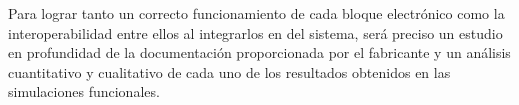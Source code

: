\vspace{3mm}

Para lograr tanto un correcto funcionamiento de cada bloque electrónico como la interoperabilidad entre ellos al integrarlos en del sistema, será preciso un estudio en profundidad de la documentación proporcionada por el fabricante y un análisis cuantitativo y cualitativo de cada uno de los resultados obtenidos en las simulaciones funcionales. 

\vspace{1mm}











